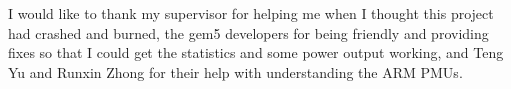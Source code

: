 I would like to thank my supervisor for helping me when I thought this project 
had crashed and burned, the gem5 developers for being friendly and providing 
fixes so that I could get the statistics and some power output working, and 
Teng Yu and Runxin Zhong for their help with understanding the ARM PMUs.
